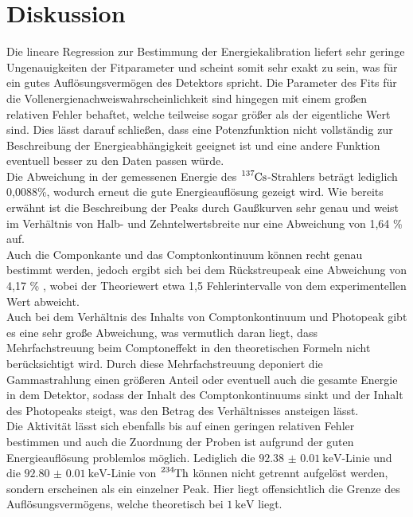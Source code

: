 \section{Diskussion}
Die lineare Regression zur Bestimmung der Energiekalibration liefert sehr geringe Ungenauigkeiten
der Fitparameter und scheint somit sehr exakt zu sein, was für ein gutes Auflösungsvermögen
des Detektors spricht. Die Parameter des Fits für die Vollenergienachweiswahrscheinlichkeit sind hingegen
mit einem großen relativen Fehler behaftet, welche teilweise sogar größer als der
eigentliche Wert sind. Dies lässt darauf schließen, dass eine Potenzfunktion
nicht vollständig zur Beschreibung der Energieabhängigkeit geeignet ist und
eine andere Funktion eventuell besser zu den Daten passen würde. \\
Die Abweichung in der gemessenen Energie des $\ce{^{137}Cs}$-Strahlers beträgt lediglich
0,0088\%, wodurch erneut die gute Energieauflösung gezeigt wird. Wie bereits erwähnt
ist die Beschreibung der Peaks durch Gaußkurven sehr genau und weist im Verhältnis
von Halb- und Zehntelwertsbreite nur eine Abweichung von 1,64 \% auf. \\
Auch die Componkante und das Comptonkontinuum können recht genau bestimmt werden,
jedoch ergibt sich bei dem Rückstreupeak eine Abweichung von 4,17 \% , wobei der Theoriewert etwa 1,5
Fehlerintervalle von dem experimentellen Wert abweicht. \\
Auch bei dem Verhältnis des Inhalts von Comptonkontinuum und Photopeak gibt es eine
sehr große Abweichung, was vermutlich daran liegt, dass Mehrfachstreuung beim
Comptoneffekt in den theoretischen Formeln nicht berücksichtigt wird. Durch diese
Mehrfachstreuung deponiert die Gammastrahlung einen größeren Anteil oder eventuell auch die
gesamte Energie in dem Detektor, sodass der Inhalt des Comptonkontinuums sinkt und der
Inhalt des Photopeaks steigt, was den Betrag des Verhältnisses ansteigen lässt. \\
Die Aktivität lässt sich ebenfalls bis auf einen geringen
relativen Fehler bestimmen und auch die Zuordnung der Proben ist aufgrund der
guten Energieauflösung problemlos möglich. Lediglich die $\SI{92.38(1)}{\kilo\electronvolt}$-Linie
und die $\SI{92.80(1)}{\kilo\electronvolt}$-Linie von $\ce{^{234}Th}$ können nicht
getrennt aufgelöst werden, sondern erscheinen als ein einzelner Peak. Hier liegt offensichtlich
die Grenze des Auflösungsvermögens, welche theoretisch bei $\SI{1}{\kilo\electronvolt}$ liegt.
